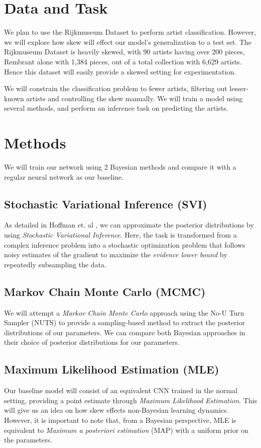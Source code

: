 \documentclass{article}
\begin{document}
\section{Data and Task}
We plan to use the Rijkmuseum Dataset \cite{Rijksmuseum} to perform artist
classification. However, we will explore how skew will effect our model's
generalization to a test set. The Rijkmuseum Dataset is heavily skewed,
with 90 artists having over 200 pieces, Rembrant alone with 1,384 pieces, out of
a total collection with 6,629 artists. Hence this dataset will easily provide a
skewed setting for experimentation.

We will constrain the classification problem to fewer artists, filtering out
lesser-known artists and controlling the skew manually. We will train a model
using several methods, and perform an inference task on predicting the artists.

\section{Methods}
We will train our network using 2 Bayesian methods and compare it with a regular
neural network as our baseline.
\subsection{Stochastic Variational Inference (SVI)}
As detailed in Hoffman et. al \cite{SVI}, we can approximate the posterior
distributions by using \textit{Stochastic Variational Inference}. Here, the
task is transformed from a complex inference problem into a stochastic
optimization problem that follows noisy estimates of the gradient to
maximize the \textit{evidence lower bound} by repeatedly subsampling the data.
\subsection{Markov Chain Monte Carlo (MCMC)}
We will attempt a \textit{Markov Chain Monte Carlo} approach using the No-U Turn Sampler
(NUTS) \cite{NUTS} to provide a sampling-based method to extract the posterior
distributions of our parameters. We can compare both Bayesian approaches in
their choice of posterior distributions for our parameters.
\subsection{Maximum Likelihood Estimation (MLE)}
Our baseline model will consist of an equivalent CNN trained in the normal setting,
providing a point estimate through \textit{Maximum Likelihood Estimation}.
This will give us an idea on how skew effects non-Bayesian learning dynamics.
However, it is important to note that, from a Bayesian perspective, MLE is
equivalent to \textit{Maximum a posteriori estimation} (MAP) with a uniform prior
on the parameters.
\end{document}
